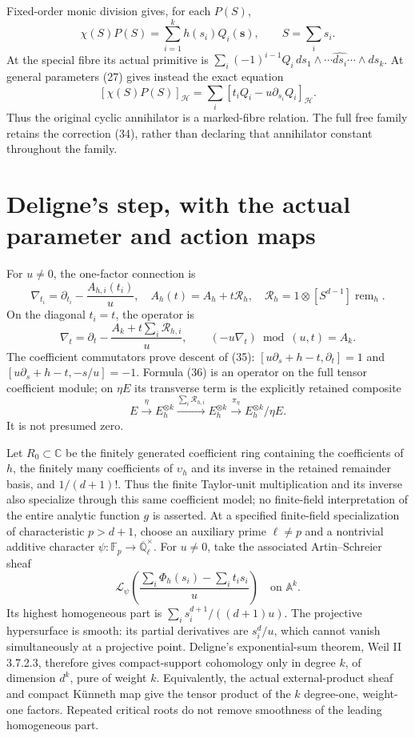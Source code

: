 \documentclass[11pt]{article}
\begin{document}
Fixed-order monic division gives, for each $P(S)$,
\[
 \chi(S)P(S)=\sum_{i=1}^k h(s_i)Q_i(\mathbf s),\qquad S=\sum_i s_i.
 \tag{33}
\]
At the special fibre its actual primitive is $\sum_i(-1)^{i-1}Q_i\,ds_1\wedge\cdots\widehat{ds_i}\cdots\wedge ds_k$. At general parameters (27) gives instead the exact equation
\[
 [\chi(S)P(S)]_{\mathcal H}
   =\sum_i[t_iQ_i-u\partial_{s_i}Q_i]_{\mathcal H}.
 \tag{34}
\]
Thus the original cyclic annihilator is a marked-fibre relation. The full free family retains the correction (34), rather than declaring that annihilator constant throughout the family.

\section{Deligne's step, with the actual parameter and action maps}
For $u\ne0$, the one-factor connection is
\[
 \nabla_{t_i}=\partial_{t_i}-\frac{A_{h,i}(t_i)}u,
 \quad A_h(t)=A_h+t\mathcal R_h,
 \quad\mathcal R_h=1\otimes[S^{d-1}]\operatorname{rem}_h.
 \tag{35}
\]
On the diagonal $t_i=t$, the operator is
\[
 \nabla_t=\partial_t-\frac{A_k+t\sum_i\mathcal R_{h,i}}u,
 \qquad (-u\nabla_t)\bmod(u,t)=A_k.
 \tag{36}
\]
The coefficient commutators prove descent of (35): $[u\partial_s+h-t,\partial_t]=1$ and $[u\partial_s+h-t,-s/u]=-1$. Formula (36) is an operator on the full tensor coefficient module; on $\eta E$ its transverse term is the explicitly retained composite
\[
 E\xrightarrow{\eta}E_h^{\otimes k}
 \xrightarrow{\sum_i\mathcal R_{h,i}}E_h^{\otimes k}
 \xrightarrow{\pi_\eta}E_h^{\otimes k}/\eta E.
 \tag{37}
\]
It is not presumed zero.

Let $R_0\subset\mathbb C$ be the finitely generated coefficient ring containing the coefficients of $h$, the finitely many coefficients of $\upsilon_h$ and its inverse in the retained remainder basis, and $1/(d+1)!$. Thus the finite Taylor-unit multiplication and its inverse also specialize through this same coefficient model; no finite-field interpretation of the entire analytic function $g$ is asserted. At a specified finite-field specialization of characteristic $p>d+1$, choose an auxiliary prime $\ell\ne p$ and a nontrivial additive character $\psi:\mathbb F_p\to\overline{\mathbb Q}_\ell^\times$. For $u\ne0$, take the associated Artin--Schreier sheaf
\[
 \mathcal L_\psi\!\left(
   \frac{\sum_i\Phi_h(s_i)-\sum_it_is_i}{u}\right)
 \quad\text{on }\mathbb A^k.
 \tag{38}
\]
Its highest homogeneous part is $\sum_i s_i^{d+1}/((d+1)u)$. The projective hypersurface is smooth: its partial derivatives are $s_i^d/u$, which cannot vanish simultaneously at a projective point. Deligne's exponential-sum theorem, Weil II 3.7.2.3, therefore gives compact-support cohomology only in degree $k$, of dimension $d^k$, pure of weight $k$. Equivalently, the actual external-product sheaf and compact K\"unneth map give the tensor product of the $k$ degree-one, weight-one factors. Repeated critical roots do not remove smoothness of the leading homogeneous part.
\end{document}
